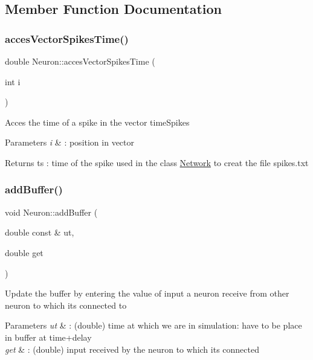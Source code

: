 \subsection{Member Function Documentation}
\mbox{\label{class_neuron_a178217a3d7ccc951c207a78883a26546}} 
\subsubsection{\texorpdfstring{acces\+Vector\+Spikes\+Time()}{accesVectorSpikesTime()}}
{\footnotesize\ttfamily double Neuron\+::acces\+Vector\+Spikes\+Time (\begin{DoxyParamCaption}\item[{int}]{i }\end{DoxyParamCaption})}

Acces the time of a spike in the vector time\+Spikes 
\begin{DoxyParams}{Parameters}
{\em i} & \+: position in vector \\
\hline
\end{DoxyParams}
\begin{DoxyReturn}{Returns}
ts \+: time of the spike used in the class \hyperlink{class_network}{Network} to creat the file spikes.\+txt 
\end{DoxyReturn}
\mbox{\label{class_neuron_aa31661c57b4a07fc1ec4984be980b678}} 
\subsubsection{\texorpdfstring{add\+Buffer()}{addBuffer()}}
{\footnotesize\ttfamily void Neuron\+::add\+Buffer (\begin{DoxyParamCaption}\item[{double const \&}]{ut,  }\item[{double}]{get }\end{DoxyParamCaption})}

Update the buffer by entering the value of input a neuron receive from other neuron to which it\textquotesingle{}s connected to 
\begin{DoxyParams}{Parameters}
{\em ut} & \+: (double) time at which we are in simulation\+: have to be place in buffer at time+delay \\
\hline
{\em get} & \+: (double) input received by the neuron to which its connected \\
\hline
\end{DoxyParams}
\mbox{\label{class_neuron_a41d30979b71ec096e1fd04f9e4de25d4}} 
